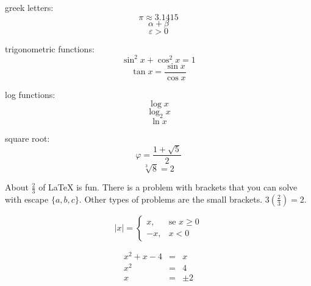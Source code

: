 \documentclass[12pt,a4paper]{article}
\begin{document}
greek letters:
$$\pi \approx 3.1415$$
$$\alpha + \beta$$
$$\varepsilon > 0$$

trigonometric functions:
$$\sin^2{x} + \cos^2{x} = 1$$
$$\tan{x} = \frac{\sin{x}}{\cos{x}}$$

log functions:
$$\log{x}$$
$$\log_2{x}$$
$$\ln{x}$$

square root:
$$\varphi=\frac{1 +\sqrt{5}}{2}$$
$$\sqrt[3]{8}=2$$

About $\displaystyle{\frac{2}{3}}$ of {\LaTeX} is fun. There is a problem
with brackets that you can solve with escape $\{a,b,c\}$. Other types of problems are the small brackets. $\displaystyle{3\left(\frac{2}{3}\right) = 2}$.

$$
|x| =
\left\{
  \begin{array}{rr}
		x,  & \textrm{se } x \geq 0 \\
		-x, & x < 0
	\end{array}
\right.
$$

\begin{eqnarray*}
x^2+x-4&=&x \\
x^2 &=&4 \\
x &=& \pm 2 
\end{eqnarray*}
\end{document}
